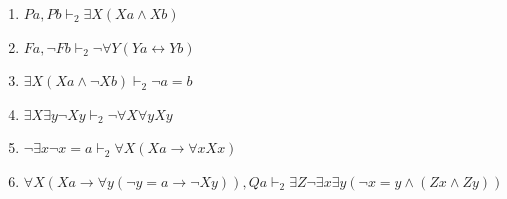 \begin{enumerate}
    \item \( P a, P b \vdash_2 \exists X (X a \wedge X b) \)
    \item \( F a, \neg F b \vdash_2 \neg \forall Y (Y a \leftrightarrow Y b) \)
    \item \( \exists X (X a \wedge \neg X b) \vdash_2 \neg a = b \)
    \item \( \exists X \exists y \neg X y \vdash_2 \neg \forall X \forall y X y \)
    \item \( \neg \exists x \neg x = a \vdash_2 \forall X (X a \rightarrow \forall x X x) \)
    \item \( \forall X (X a \rightarrow \forall y (\neg y = a \rightarrow \neg X y)), Q a \vdash_2 \exists Z \neg \exists x \exists y (\neg x = y \wedge (Z x \wedge Z y)) \)
\end{enumerate}

\newpage
